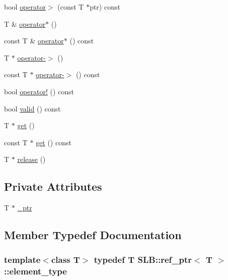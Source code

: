 \begin{DoxyCompactItemize}
bool \hyperlink{classSLB_1_1ref__ptr_a148deeacf2f5ccef84e1f03f5d4f26cd}{operator$>$} (const T $\ast$ptr) const 
\item 
T \& \hyperlink{classSLB_1_1ref__ptr_a919fed55245d000dca744de75e20089a}{operator$\ast$} ()
\item 
const T \& \hyperlink{classSLB_1_1ref__ptr_ad1493528263b352efe383eff83ce0196}{operator$\ast$} () const 
\item 
T $\ast$ \hyperlink{classSLB_1_1ref__ptr_a719e3d5537351d432cd8f012a020f4af}{operator-\/$>$} ()
\item 
const T $\ast$ \hyperlink{classSLB_1_1ref__ptr_ae08f5418c3e9d38c4a0b8b956db77b6b}{operator-\/$>$} () const 
\item 
bool \hyperlink{classSLB_1_1ref__ptr_acf48f1a195fc11d790f18bf0aba4a581}{operator!} () const 
\item 
bool \hyperlink{classSLB_1_1ref__ptr_ad6c7964f17000177135c0e125f34ae28}{valid} () const 
\item 
T $\ast$ \hyperlink{classSLB_1_1ref__ptr_a37ff7ebe7e59ea6ae58919075a113a03}{get} ()
\item 
const T $\ast$ \hyperlink{classSLB_1_1ref__ptr_a53528ae647aa1a9952eb48582c8f075a}{get} () const 
\item 
T $\ast$ \hyperlink{classSLB_1_1ref__ptr_a9c45bbc883da5e77a4e586da912bfdf0}{release} ()
\end{DoxyCompactItemize}
\subsection*{Private Attributes}
\begin{DoxyCompactItemize}
\item 
T $\ast$ \hyperlink{classSLB_1_1ref__ptr_a5f7ab90e295167cb1063f5e40233c00a}{\+\_\+ptr}
\end{DoxyCompactItemize}


\subsection{Member Typedef Documentation}
\subsubsection[{\texorpdfstring{element\+\_\+type}{element_type}}]{\setlength{\rightskip}{0pt plus 5cm}template$<$class T$>$ typedef T {\bf S\+L\+B\+::ref\+\_\+ptr}$<$ T $>$\+::{\bf element\+\_\+type}}\hypertarget{classSLB_1_1ref__ptr_a967e377b06e2f0d4acf989581c2222d5}{}\label{classSLB_1_1ref__ptr_a967e377b06e2f0d4acf989581c2222d5}


